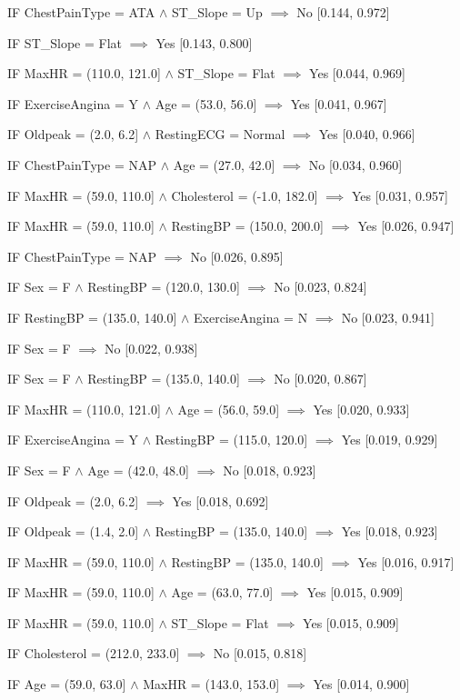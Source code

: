 IF ChestPainType = ATA $\land$ ST\_Slope = Up $\implies$ No [0.144, 0.972]

IF ST\_Slope = Flat $\implies$ Yes [0.143, 0.800]

IF MaxHR = (110.0, 121.0] $\land$ ST\_Slope = Flat $\implies$ Yes [0.044, 0.969]

IF ExerciseAngina = Y $\land$ Age = (53.0, 56.0] $\implies$ Yes [0.041, 0.967]

IF Oldpeak = (2.0, 6.2] $\land$ RestingECG = Normal $\implies$ Yes [0.040, 0.966]

IF ChestPainType = NAP $\land$ Age = (27.0, 42.0] $\implies$ No [0.034, 0.960]

IF MaxHR = (59.0, 110.0] $\land$ Cholesterol = (-1.0, 182.0] $\implies$ Yes [0.031, 0.957]

IF MaxHR = (59.0, 110.0] $\land$ RestingBP = (150.0, 200.0] $\implies$ Yes [0.026, 0.947]

IF ChestPainType = NAP $\implies$ No [0.026, 0.895]

IF Sex = F $\land$ RestingBP = (120.0, 130.0] $\implies$ No [0.023, 0.824]

IF RestingBP = (135.0, 140.0] $\land$ ExerciseAngina = N $\implies$ No [0.023, 0.941]

IF Sex = F $\implies$ No [0.022, 0.938]

IF Sex = F $\land$ RestingBP = (135.0, 140.0] $\implies$ No [0.020, 0.867]

IF MaxHR = (110.0, 121.0] $\land$ Age = (56.0, 59.0] $\implies$ Yes [0.020, 0.933]

IF ExerciseAngina = Y $\land$ RestingBP = (115.0, 120.0] $\implies$ Yes [0.019, 0.929]

IF Sex = F $\land$ Age = (42.0, 48.0] $\implies$ No [0.018, 0.923]

IF Oldpeak = (2.0, 6.2] $\implies$ Yes [0.018, 0.692]

IF Oldpeak = (1.4, 2.0] $\land$ RestingBP = (135.0, 140.0] $\implies$ Yes [0.018, 0.923]

IF MaxHR = (59.0, 110.0] $\land$ RestingBP = (135.0, 140.0] $\implies$ Yes [0.016, 0.917]

IF MaxHR = (59.0, 110.0] $\land$ Age = (63.0, 77.0] $\implies$ Yes [0.015, 0.909]

IF MaxHR = (59.0, 110.0] $\land$ ST\_Slope = Flat $\implies$ Yes [0.015, 0.909]

IF Cholesterol = (212.0, 233.0] $\implies$ No [0.015, 0.818]

IF Age = (59.0, 63.0] $\land$ MaxHR = (143.0, 153.0] $\implies$ Yes [0.014, 0.900]

